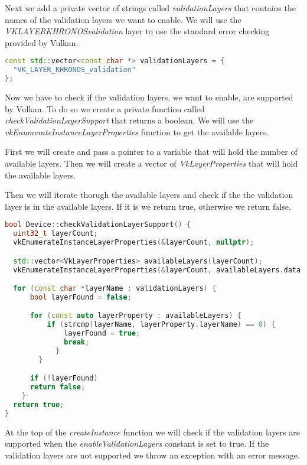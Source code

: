 \documentclass[12pt]{report} \usepackage{preamble}
\begin{document}
Next we add a private vector of strings called \textit{validationLayers} that contains the names of the
validation layers we want to enable.
We will use the \textit{VK\textunderscore LAYER\textunderscore KHRONOS\textunderscore validation}
layer to use the standard error checking provided by Vulkan.

\begin{lstlisting}[language=C++]
const std::vector<const char *> validationLayers = {
  "VK_LAYER_KHRONOS_validation"
};
\end{lstlisting}

Now we have to check if the validation layers, we want to enable, are supported by Vulkan.
To do so we create a private function called \textit{checkValidationLayerSupport} that returns a boolean.
We will use the \textit{vkEnumerateInstanceLayerProperties} function to get the available layers.

First we will create and pass a pointer to a variable that will hold the number of available layers.
Then we will create a vector of \textit{VkLayerProperties} that will hold the available layers.

Then we will iterate thorugh the available layers and check if the the validation layer is in the available layers.
If it is we return true, otherwise we return false.

\begin{lstlisting}[language=C++]
bool Device::checkValidationLayerSupport() {
  uint32_t layerCount;
  vkEnumerateInstanceLayerProperties(&layerCount, nullptr);

  std::vector<VkLayerProperties> availableLayers(layerCount);
  vkEnumerateInstanceLayerProperties(&layerCount, availableLayers.data());

  for (const char *layerName : validationLayers) {
      bool layerFound = false;

      for (const auto layerProperty : availableLayers) {
          if (strcmp(layerName, layerProperty.layerName) == 0) {
              layerFound = true;
              break;
            }
        }

      if (!layerFound)
      return false;
    }
  return true;
}
\end{lstlisting}

At the top of the \textit{createInstance} function we will check if the validation layers are supported
when the \textit{enableValidationLayers} constant is set to true. If the validation layers are not
supported we throw an exception with an error message.
\end{document}
